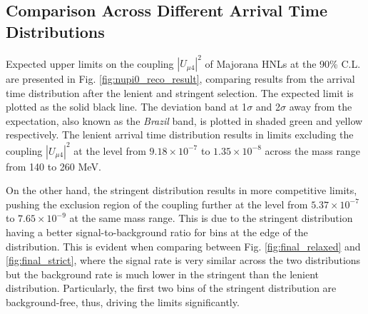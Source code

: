 \subsection{Comparison Across Different Arrival Time Distributions}

Expected upper limits on the coupling $|U_{\mu4}|^2$ of Majorana HNLs at the 90\% C.L. are presented in Fig. \ref{fig:nupi0_reco_result}, comparing results from the arrival time distribution after the lenient and stringent selection.
The expected limit is plotted as the solid black line.
The deviation band at 1$\sigma$ and 2$\sigma$ away from the expectation, also known as the \textit{Brazil} band, is plotted in shaded green and yellow respectively.
The lenient arrival time distribution results in limits excluding the coupling $|U_{\mu4}|^2$ at the level from $9.18 \times 10^{-7}$ to $1.35 \times 10^{-8}$ across the mass range from 140 to 260 MeV.

On the other hand, the stringent distribution results in more competitive limits, pushing the exclusion region of the coupling further at the level from $5.37 \times 10^{-7}$ to $7.65 \times 10^{-9}$ at the same mass range.
This is due to the stringent distribution having a better signal-to-background ratio for bins at the edge of the distribution.
This is evident when comparing between Fig. \ref{fig:final_relaxed} and \ref{fig:final_strict}, where the signal rate is very similar across the two distributions but the background rate is much lower in the stringent than the lenient distribution.
Particularly, the first two bins of the stringent distribution are background-free, thus, driving the limits significantly.

